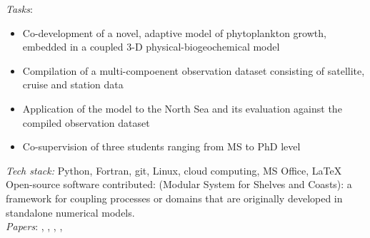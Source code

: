 \documentclass[
	a4paper,
]{fortysecondscv}
\begin{document}
\newpage



{\Huge\color{maincolor}\cvname}
\vspace*{-10mm}

\cvsection{}
\begin{cvtable}[1.0]
	{\href{https://www.hereon.de/}{\color{pblue}{Helmholtz-Zentrum Hereon, Germany}}}
	{\textit{Tasks}:
	\begin{itemize}[topsep=0pt,itemsep=0pt,partopsep=0pt, parsep=0pt, leftmargin=*]
     \item Co-development of a novel, adaptive model of phytoplankton growth, embedded in a coupled 3-D physical-biogeochemical model
     \item Compilation of a multi-compoenent observation dataset consisting of satellite, cruise and station data
     \item Application of the model to the North Sea and its evaluation against the compiled observation dataset
     \item Co-supervision of three students ranging from MS to PhD level
    \end{itemize}
      \textit{Tech stack:} Python, Fortran, git, Linux, cloud computing, MS Office, \LaTeX \\
      Open-source software contributed:
      \href{git@github.com:platipodium/mossco-code.git}{\color{pblue}{MOSSCO}} (Modular System for Shelves and Coasts): a framework for coupling processes or domains that are originally developed in standalone numerical models.\\
      \textit{Papers}:
      \href{https://doi.org/10.3389/fevo.2016.00131}{\color{pblue}{1}}
      \href{https://doi.org/10.1016/j.ecolmodel.2017.07.008}{\color{pblue}{2}},
      \href{https://doi.org/10.5194/bg-14-4499-2017}{\color{pblue}{3}},
      \href{https://doi.org/10.5194/gmd-11-915-2018}{\color{pblue}{4}},
      \href{https://doi.org/10.1016/j.ecss.2017.11.002}{\color{pblue}{5}},
      \href{https://doi.org/10.1007/s10750-018-3653-5}{\color{pblue}{6}}
      }


\end{cvtable}
\end{document}
